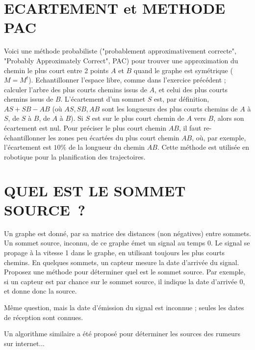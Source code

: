 \documentclass[a4paper]{article}
\begin{document}
\section{ECARTEMENT et METHODE PAC}
Voici une  m\'ethode probabiliste ("probablement approximativement correcte", "Probably Approximately Correct", PAC) pour trouver
une approximation du chemin le plus court entre 2 points $A$ et $B$ quand le graphe est sym\'etrique ($M=M^t$). Echantillonner
l'espace libre, comme dans l'exercice pr\'ec\'edent ; calculer l'arbre des plus courts chemins issus
de $A$, et celui des plus courts chemins 
issus de $B$. L'\'ecartement d'un sommet $S$ est, par d\'efinition,
$AS + SB - AB$ (o\`u $AS, SB, AB$ sont les longueurs des plus courts chemins de $A$ \`a $S$, de $S$ \`a $B$, de $A$ \`a $B$). Si $S$ est sur le plus court chemin de $A$ vers $B$, alors son \'ecartement est nul. Pour pr\'eciser le plus court chemin $AB$, il faut re-\'echantillonner les zones peu \'ecart\'ees du plus court chemin $AB$,   o\`u, par exemple, l'\'ecartement est $10\%$ 
de la longueur du chemin $AB$.
Cette m\'ethode est utilis\'ee en robotique pour la  planification des trajectoires.

{
\section{QUEL EST LE SOMMET SOURCE~?}
Un graphe est donn\'e, par sa matrice des distances (non n\'egatives) entre sommets.
Un sommet source, inconnu, de ce graphe \'emet un signal au temps $0$. Le signal
se propage \`a la vitesse 1 dans le graphe, en utilisant toujours les plus courts chemins.
En quelques sommets, un capteur mesure la date d'arriv\'ee du signal.
Proposez une m\'ethode pour d\'eterminer quel est le sommet source. 
Par exemple, si un capteur est par chance sur le sommet source, il indique la date d'arriv\'ee 0,
et donne donc la source.

M\^eme question, mais la date d'\'emission du signal est inconnue ; seules les dates  
de r\'eception sont connues.

Un algorithme similaire a \'et\'e propos\'e pour d\'eterminer les sources des rumeurs sur internet...

}
\end{document}
